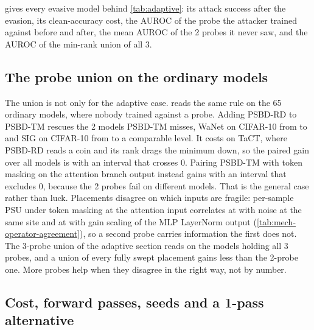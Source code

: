  gives every evasive model behind \cref{tab:adaptive}: its attack success after the evasion, its clean-accuracy cost, the AUROC of the probe the attacker trained against before and after, the mean AUROC of the 2 probes it never saw, and the AUROC of the min-rank union of all 3.



\FloatBarrier


\subsection{The probe union on the ordinary models}
\label{app:union}

The union is not only for the adaptive case.  reads the same rule on the 65 ordinary models, where nobody trained against a probe. Adding PSBD-RD to PSBD-TM rescues the 2 models PSBD-TM misses, WaNet on CIFAR-10 from \ProbeUnionWanetCifarOneZeroTm{} to \ProbeUnionWanetCifarOneZeroTmRd{} and SIG on CIFAR-10 from \HeadlineFloorAuroc{} to a comparable level. It costs on TaCT, where PSBD-RD reads a coin and its rank drags the minimum down, so the paired gain over all models is \ProbeUnionTmRdGain{} with an interval \ProbeUnionTmRdGainCi{} that crosses 0. Pairing PSBD-TM with token masking on the attention branch output instead gains \ProbeUnionTmBranchGain{} with an interval that excludes 0, because the 2 probes fail on different models. That is the general case rather than luck. Placements disagree on which inputs are fragile: per-sample PSU under token masking at the attention input correlates at \AgreementGaussianVsTokenMaskClean{} with noise at the same site and at \AgreementGainScaleVsRecommendedClean{} with gain scaling of the MLP LayerNorm output (\cref{tab:mech-operator-agreement}), so a second probe carries information the first does not. The 3-probe union of the adaptive section reads \ProbeUnionThreeProbeAuroc{} on the \ProbeUnionThreeProbeN{} models holding all 3 probes, and a union of every fully swept placement gains less than the 2-probe one. More probes help when they disagree in the right way, not by number.



\subsection{Cost, forward passes, seeds and a 1-pass alternative}
\label{app:cost}

